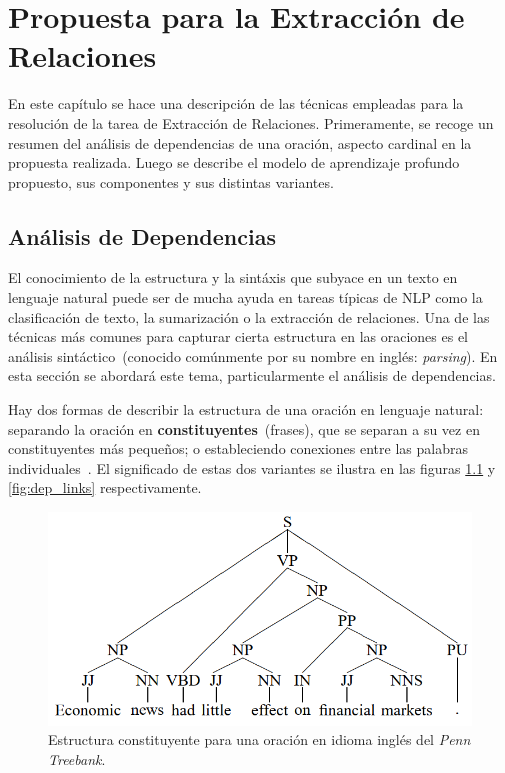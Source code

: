 \chapter{Propuesta para la Extracción de Relaciones}\label{chapter:relations}

En este capítulo se hace una descripción de las técnicas empleadas para la resolución de la tarea de Extracción de Relaciones.
Primeramente, se recoge un resumen del análisis de dependencias de una oración, aspecto cardinal en la propuesta realizada.
Luego se describe el modelo de aprendizaje profundo propuesto, sus componentes y sus distintas variantes.


\section{Análisis de Dependencias}\label{sec:parsing}

El conocimiento de la estructura y la sintáxis que subyace en un texto en lenguaje natural puede ser de mucha ayuda en tareas típicas de NLP como la clasificación de texto, la sumarización o la extracción de relaciones.
Una de las técnicas más comunes para capturar cierta estructura en las oraciones es el análisis sintáctico~(conocido comúnmente por su nombre en inglés: \emph{parsing}).
En esta sección se abordará este tema, particularmente el análisis de dependencias.

Hay dos formas de describir la estructura de una oración en lenguaje natural: separando la oración en \textbf{constituyentes}~(frases), que se separan a su vez en constituyentes más pequeños; o estableciendo conexiones entre las palabras individuales~\cite{covington2001fundamental}.
El significado de estas dos variantes se ilustra en las figuras \ref{fig:dep_const} y \ref{fig:dep_links} respectivamente.

\begin{figure}[h!]
	\centering
	\includegraphics[width=0.8\linewidth]{Graphics/dep_const.png}
	\caption{Estructura constituyente para una oración en idioma inglés del \emph{Penn Treebank}.}\label{fig:dep_const}
\end{figure}

